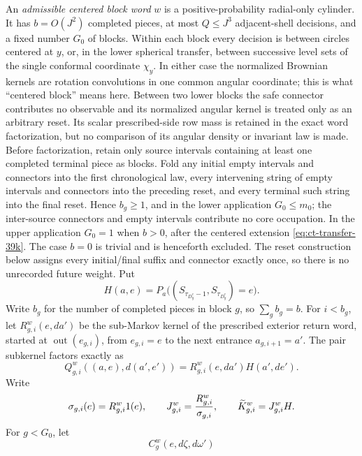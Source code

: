 \documentclass[12pt,reqno]{amsart}
\theoremstyle{plain}
\theoremstyle{definition}
\theoremstyle{remark}
\numberwithin{equation}{section}
\begin{document}
An \emph{admissible centered block word} \(w\) is a positive-probability
radial-only cylinder.  It has \(b=O(J^2)\) completed pieces, at most
\(Q\le J^3\) adjacent-shell decisions, and a fixed
number \(G_0\) of blocks.  Within each block every decision is between
circles centered at \(y\), or, in the lower spherical transfer, between successive level
sets of the single conformal coordinate \(\chi_y\).  In either case the
normalized Brownian kernels are rotation convolutions in one common
angular coordinate; this is what ``centered block'' means here.  Between
two lower blocks the safe connector contributes no observable and its
normalized angular kernel is treated only as an arbitrary reset.  Its
scalar prescribed-side row mass is retained in the exact word
factorization, but no comparison of its angular density or invariant law
is made.  Before factorization, retain only source intervals containing
at least one completed terminal piece as blocks.  Fold any initial empty
intervals and connectors into the first chronological law, every
intervening string of empty intervals and connectors into the preceding
reset, and every terminal such string into the final reset.  Hence
\(b_g\ge1\), and in the lower application \(G_0\le m_0\); the
inter-source connectors and empty intervals contribute no core
occupation.  In the upper application \(G_0=1\) when \(b>0\), after the
centered extension \eqref{eq:ct-transfer-39k}.  The case \(b=0\) is trivial and is henceforth
excluded.  The reset construction below assigns every initial/final
suffix and connector exactly once, so there is no unrecorded future
weight.  Put
\[
 H(a,e)=P_a\big((S_{\tau_{D_y^c}-1},S_{\tau_{D_y^c}})=e\big).
\]
Write \(b_g\) for the number of completed pieces in block \(g\), so
\(\sum_gb_g=b\).  For \(i<b_g\), let
\(R_{g,i}^w(e,da')\) be the sub-Markov kernel of the prescribed exterior
return word, started at \(\operatorname{out}(e_{g,i})\), from
\(e_{g,i}=e\) to the next entrance
\(a_{g,i+1}=a'\).  The pair subkernel factors exactly as
\begin{equation}
 Q_{g,i}^w((a,e),d(a',e'))=
       R_{g,i}^w(e,da')H(a',de').                           \label{eq:tu-47c}
\end{equation}
Write
\begin{equation}
 \sigma_{g,i}(e)=R_{g,i}^w1(e),\qquad
 J_{g,i}^w={R_{g,i}^w\over\sigma_{g,i}},
 \qquad\widetilde K_{g,i}^w=J_{g,i}^wH.                    \label{eq:tu-47d}
\end{equation}
For \(g<G_0\), let
\begin{equation}
 C_g^w(e,d\zeta,d\omega')                                  \label{eq:tu-47d-prime}
\end{equation}
\end{document}
